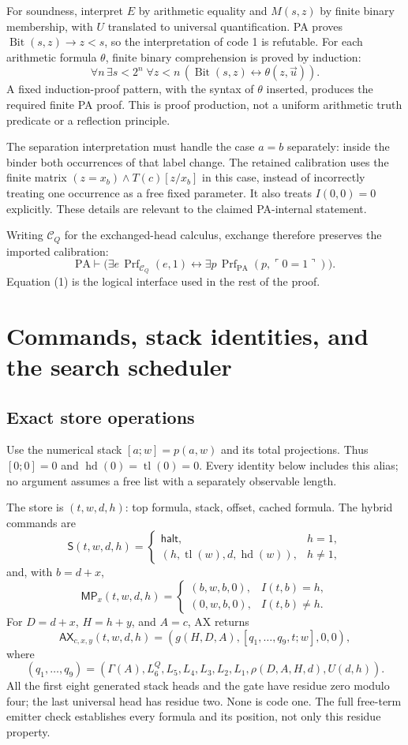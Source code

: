 \documentclass[11pt,letterpaper]{article}
\newcommand{\PA}{\mathrm{PA}}
\newcommand{\Prf}{\operatorname{Prf}}
\newcommand{\AX}{\mathsf{AX}}
\newcommand{\MP}{\mathsf{MP}}
\newcommand{\Shift}{\mathsf S}
\begin{document}
For soundness, interpret $E$ by arithmetic equality and $M(s,z)$ by finite
binary membership, with $U$ translated to universal quantification. PA
proves $\operatorname{Bit}(s,z)\to z<s$, so the interpretation of code 1
is refutable. For each arithmetic formula $\theta$, finite binary
comprehension is proved by induction:
\[
 \forall n\,\exists s<2^n\;\forall z<n\,
 (\operatorname{Bit}(s,z)\leftrightarrow\theta(z,\vec u)).
\]
A fixed induction-proof pattern, with the syntax of $\theta$ inserted,
produces the required finite PA proof. This is proof production, not a
uniform arithmetic truth predicate or a reflection principle.

The separation interpretation must handle the case $a=b$ separately:
inside the binder both occurrences of that label change. The retained
calibration uses the finite matrix $(z=x_b)\wedge T(c)[z/x_b]$ in this
case, instead of incorrectly treating one occurrence as a free fixed
parameter. It also treats $I(0,0)=0$ explicitly. These details are relevant
to the claimed PA-internal statement.

Writing $\mathcal C_Q$ for the exchanged-head calculus, exchange therefore
preserves the imported calibration:
\[
 \PA\vdash
 \bigl(\exists e\,\Prf_{\mathcal C_Q}(e,1)
       \leftrightarrow\exists p\,\Prf_{\PA}(p,\ulcorner0=1\urcorner)\bigr).
\tag{1}
\]
Equation (1) is the logical interface used in the rest of the proof.

\section{Commands, stack identities, and the search scheduler}
\label{sec:commands}

\subsection{Exact store operations}
Use the numerical stack $[a;w]=p(a,w)$ and its total projections. Thus
$[0;0]=0$ and $\operatorname{hd}(0)=\operatorname{tl}(0)=0$. Every identity
below includes this alias; no argument assumes a free list with a
separately observable length.

The store is $(t,w,d,h)$: top formula, stack, offset, cached formula. The
hybrid commands are
\[
 \Shift(t,w,d,h)=
 \begin{cases}\mathsf{halt},&h=1,\\
 (h,\operatorname{tl}(w),d,\operatorname{hd}(w)),&h\ne1,
 \end{cases}
\]
and, with $b=d+x$,
\[
 \MP_x(t,w,d,h)=
 \begin{cases}(b,w,b,0),&I(t,b)=h,\\(0,w,b,0),&I(t,b)\ne h.
 \end{cases}
\]
For $D=d+x$, $H=h+y$, and $A=c$, AX returns
\[
 \AX_{c,x,y}(t,w,d,h)
   =(g(H,D,A),[q_1,\ldots,q_9,t;w],0,0),
\]
where
\[
 (q_1,\ldots,q_9)=
 (\Gamma(A),L_6^Q,L_5,L_4,L_3,L_2,L_1,\rho(D,A,H,d),U(d,h)).
\]
All the first eight generated stack heads and the gate have residue zero
modulo four; the last universal head has residue two. None is code one.
The full free-term emitter check establishes every formula and its position,
not only this residue property.
\end{document}
